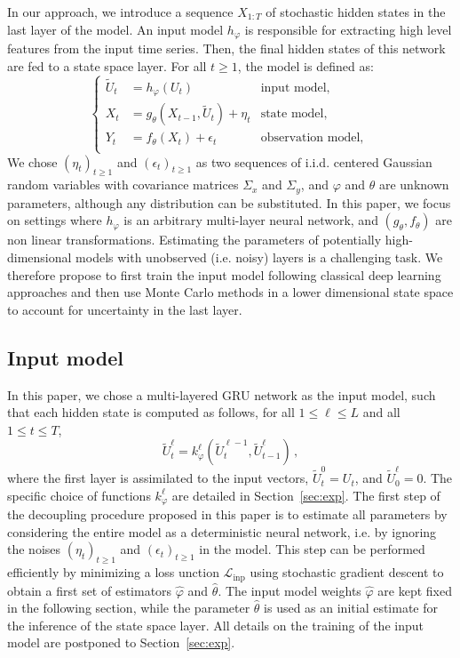 \documentclass[journal]{IEEEtran}
\begin{document}
In our approach, we introduce a sequence $X_{1:T}$ of stochastic hidden states in the last layer of the model.
An input model $h_\varphi$ is responsible for extracting high level features from the input time series. Then, the final hidden states of this network are fed to a state space layer.
For all $t \geq 1$, the model is defined as:
\begin{equation*}
	\left\{
	\begin{aligned}
		\widetilde U_t & = h_\varphi(U_t)                             & \text{input model, }       \\
		X_t            & = g_\theta(X_{t-1}, \widetilde U_t) + \eta_t & \text{state model, }       \\
		Y_t            & = f_\theta(X_t) + \epsilon_t                 & \text{observation model, } \\
	\end{aligned}
	\right.
\end{equation*}
We chose $(\eta_t)_{t\geq 1}$ and $(\epsilon_t)_{t\geq 1}$ as two sequences of i.i.d. centered Gaussian random variables with covariance matrices $\Sigma_x$ and $\Sigma_y$, and $\varphi$ and $\theta$ are unknown parameters, although any distribution can be substituted.
In this paper, we focus on settings where $h_\varphi$ is an arbitrary multi-layer neural network, and $(g_\theta, f_\theta)$ are non linear transformations.
Estimating the parameters of potentially high-dimensional models with unobserved (i.e. noisy) layers is a challenging task.
We therefore propose to first train the input model following classical deep learning approaches and then use Monte Carlo methods in a lower dimensional state space to account for uncertainty in the last layer.

\subsection{Input model}%
\label{sub:input_model}
In this paper, we chose a multi-layered GRU network as the input model, such that each hidden state is computed as follows, for all $1 \leq \ell \leq L$ and all $1 \leq t \leq T$,
$$
	\tilde U^\ell_t = k_\varphi^\ell(\widetilde U^{\ell-1}_t, \widetilde U^\ell_{t-1})\,,
$$
where the first layer is assimilated to the input vectors, $\widetilde U_t^0 = U_t$, and $\widetilde U^\ell_0 = 0$. The specific choice of functions $ k_\varphi^\ell$ are detailed in Section~\ref{sec:exp}.
The first step of the decoupling procedure proposed in this paper is to estimate all parameters by considering the entire model as a deterministic neural network, i.e. by ignoring the noises $(\eta_t)_{t\geq 1}$ and $(\epsilon_t)_{t\geq 1}$ in the model.
This step can be performed efficiently by minimizing a loss unction $\mathcal{L}_{\mathrm{inp}}$ using stochastic gradient descent to obtain a first set of estimators $\widehat \varphi$ and $ \widehat \theta$.
The input model weights $\widehat \varphi$ are kept fixed in the following section, while the parameter $\widehat \theta$ is used as an initial estimate for the inference of the state space layer.
All details on the training of the input model are postponed to Section~\ref{sec:exp}.
\end{document}
